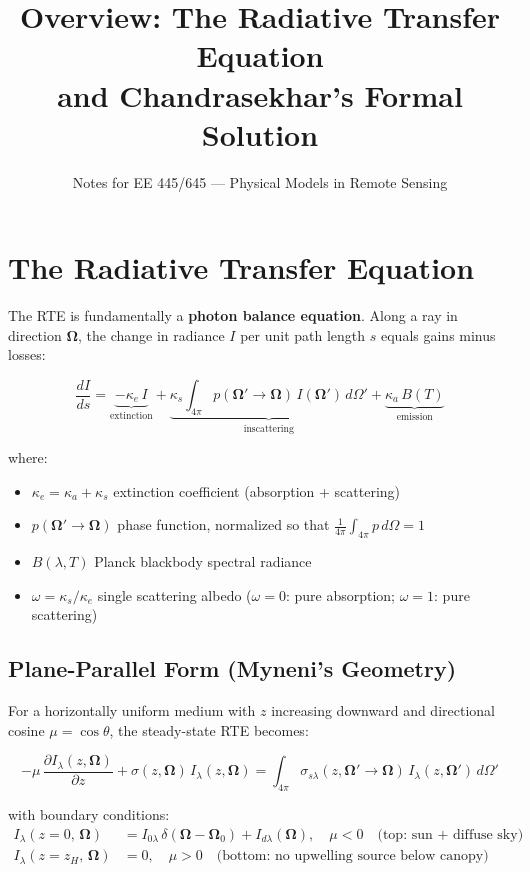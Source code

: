\documentclass[11pt]{article}
\title{Overview: The Radiative Transfer Equation \\ and Chandrasekhar's Formal Solution}
\author{Notes for EE 445/645 --- Physical Models in Remote Sensing}
\date{}
\begin{document}
\maketitle

\section{The Radiative Transfer Equation}

The RTE is fundamentally a \textbf{photon balance equation}. Along a ray in direction
$\bm{\Omega}$, the change in radiance $I$ per unit path length $s$ equals gains minus losses:

\begin{equation}
\frac{dI}{ds} =
\underbrace{-\kappa_e\, I}_{\text{extinction}}
+\underbrace{\kappa_s \int_{4\pi} p(\bm{\Omega}' \to \bm{\Omega})\, I(\bm{\Omega}')\, d\Omega'}_{\text{inscattering}}
+\underbrace{\kappa_a\, B(T)}_{\text{emission}}
\end{equation}

where:
\begin{itemize}
  \item $\kappa_e = \kappa_a + \kappa_s$ \quad extinction coefficient (absorption + scattering)
  \item $p(\bm{\Omega}' \to \bm{\Omega})$ \quad phase function, normalized so that $\frac{1}{4\pi}\int_{4\pi} p\, d\Omega = 1$
  \item $B(\lambda, T)$ \quad Planck blackbody spectral radiance
  \item $\omega = \kappa_s / \kappa_e$ \quad single scattering albedo ($\omega=0$: pure absorption; $\omega=1$: pure scattering)
\end{itemize}

\subsection*{Plane-Parallel Form (Myneni's Geometry)}

For a horizontally uniform medium with $z$ increasing downward and directional cosine
$\mu = \cos\theta$, the steady-state RTE becomes:

\begin{equation}
-\mu\,\frac{\partial I_\lambda(z,\bm{\Omega})}{\partial z}
+ \sigma(z,\bm{\Omega})\, I_\lambda(z,\bm{\Omega})
= \int_{4\pi} \sigma_{s\lambda}(z,\bm{\Omega}' \to \bm{\Omega})\, I_\lambda(z,\bm{\Omega}')\, d\Omega'
\end{equation}

with boundary conditions:
\begin{align}
I_\lambda(z=0,\,\bm{\Omega}) &= I_{0\lambda}\,\delta(\bm{\Omega}-\bm{\Omega}_0) + I_{d\lambda}(\bm{\Omega}), \quad \mu < 0 \quad\text{(top: sun + diffuse sky)} \\
I_\lambda(z=z_H,\,\bm{\Omega}) &= 0, \quad \mu > 0 \quad\text{(bottom: no upwelling source below canopy)}
\end{align}
\end{document}
